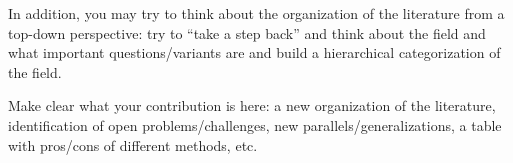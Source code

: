 In addition, you may try to think about the organization of the literature from a top-down perspective: try to ``take a step back'' and think about the field and what important questions/variants are and build a hierarchical categorization of the field.

Make clear what your contribution is here: a new organization of the literature, identification of open problems/challenges, new parallels/generalizations, a table with pros/cons of different methods, etc.\ 

